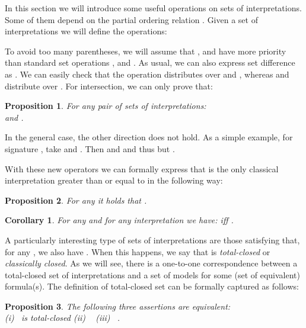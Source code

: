 \documentclass{tlp}
\def\qed{~\hfill}
\newtheorem{corollary}{Corollary}
\newtheorem{proposition}{Proposition}
\begin{document}
In this section we will introduce some useful operations on sets of interpretations. Some of them depend on the partial ordering relation . Given a set of interpretations  we will define the operations:

To avoid too many parentheses, we will assume that ,  and  have more priority than standard set operations ,  and . As usual, we can also express set difference  as . We can easily check that the  operation distributes over  and , whereas  and  distribute over . For intersection, we can only prove that:

\begin{proposition}\label{prop:distr} 
For any pair  of sets of interpretations: \\
 and .\qed
\end{proposition}

\noindent In the general case, the other direction does not hold. As a simple example, for signature , take  and . Then  and  and thus  but .

With these new operators we can formally express that  is the only classical interpretation greater than or equal to  in the following way:

\begin{proposition}\label{prop:vt} 
For any  it holds that . \qed
\end{proposition}
\begin{corollary}\label{cor:vt} 
For any  and for any interpretation  we have:  iff .\qed
\end{corollary}

A particularly interesting type of sets of interpretations are those  satisfying that, for any , we also have . When this happens, we say that  is \emph{total-closed} or \emph{classically closed}. As we will see, there is a one-to-one correspondence between a total-closed set of interpretations and a set of models for some (set of equivalent) formula(s). The definition of total-closed set can be formally captured as follows:

\begin{proposition}\label{prop:totalc} 
The following three assertions are equivalent:\\
(i) \  is total-closed
\hspace{45pt}
(ii) \ 
\hspace{45pt}
(iii) \ .\qed
\end{proposition}
\end{document}
